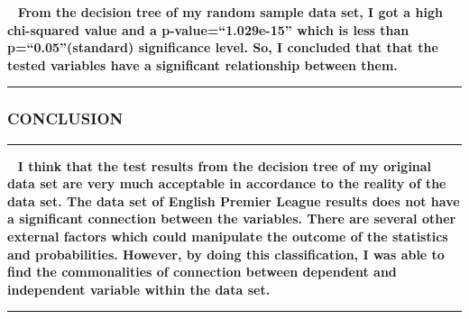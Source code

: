 \documentclass[
]{article}
\begin{document}
~ \textbf{From the decision tree of my random sample data set, I got a
high chi-squared value and a p-value=``1.029e-15'' which is less than
p=``0.05''(standard) significance level. So, I concluded that that the
tested variables have a significant relationship between them. }

\begin{center}\rule{0.5\linewidth}{0.5pt}\end{center}

\hypertarget{conclusion}{%
\subsubsection{\texorpdfstring{\textbf{CONCLUSION}}{CONCLUSION}}\label{conclusion}}

\begin{center}\rule{0.5\linewidth}{0.5pt}\end{center}

~ \textbf{I think that the test results from the decision tree of my
original data set are very much acceptable in accordance to the reality
of the data set. The data set of English Premier League results does not
have a significant connection between the variables. There are several
other external factors which could manipulate the outcome of the
statistics and probabilities. However, by doing this classification, I
was able to find the commonalities of connection between dependent and
independent variable within the data set.}

\begin{center}\rule{0.5\linewidth}{0.5pt}\end{center}
\end{document}

